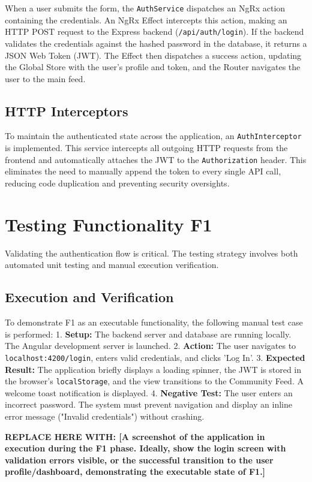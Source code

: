 When a user submits the form, the \texttt{AuthService} dispatches an NgRx action containing the credentials. An NgRx Effect intercepts this action, making an HTTP POST request to the Express backend (\texttt{/api/auth/login}). 
If the backend validates the credentials against the hashed password in the database, it returns a JSON Web Token (JWT). The Effect then dispatches a success action, updating the Global Store with the user's profile and token, and the Router navigates the user to the main feed.

\subsection{HTTP Interceptors}
To maintain the authenticated state across the application, an \texttt{AuthInterceptor} is implemented. This service intercepts all outgoing HTTP requests from the frontend and automatically attaches the JWT to the \texttt{Authorization} header. This eliminates the need to manually append the token to every single API call, reducing code duplication and preventing security oversights.

\section{Testing Functionality F1}
Validating the authentication flow is critical. The testing strategy involves both automated unit testing and manual execution verification.

\subsection{Execution and Verification}
To demonstrate F1 as an executable functionality, the following manual test case is performed:
1. \textbf{Setup:} The backend server and database are running locally. The Angular development server is launched.
2. \textbf{Action:} The user navigates to \texttt{localhost:4200/login}, enters valid credentials, and clicks 'Log In'.
3. \textbf{Expected Result:} The application briefly displays a loading spinner, the JWT is stored in the browser's \texttt{localStorage}, and the view transitions to the Community Feed. A welcome toast notification is displayed.
4. \textbf{Negative Test:} The user enters an incorrect password. The system must prevent navigation and display an inline error message ("Invalid credentials") without crashing.

\textbf{REPLACE HERE WITH: [A screenshot of the application in execution during the F1 phase. Ideally, show the login screen with validation errors visible, or the successful transition to the user profile/dashboard, demonstrating the executable state of F1.]}

